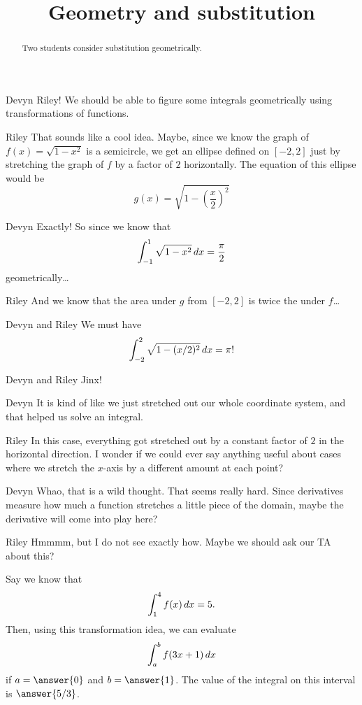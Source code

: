 \documentclass{ximera}
\title[Break-Ground:]{Geometry and substitution}
\begin{document}
\begin{abstract}
Two students consider substitution geometrically.
\end{abstract}
\maketitle

\begin{dialogue}
\item[Devyn] Riley! We should be able to figure some integrals
  geometrically using transformations of functions.
\item[Riley] That sounds like a cool idea.  Maybe, since we know the
  graph of $f(x) = \sqrt{1-x^2}$ is a semicircle, we get an ellipse
  defined on $[-2,2]$ just by stretching the graph of $f$ by a factor
  of $2$ horizontally.  The equation of this ellipse would be
  \[
  g(x) =\sqrt{1-\left(\frac{x}{2}\right)^2}
  \]
\item[Devyn] Exactly!  So since we know that
  \[
  \int_{-1}^1 \sqrt{1-x^2} \,d x = \frac{\pi}{2}
  \]
  geometrically\dots
\item[Riley] And we know that the area under $g$ from $[-2,2]$ is
  twice the under $f$\dots
\item[Devyn and Riley] We must have
  \[
  \int_{-2}^2 \sqrt{1-(x/2)^2} \,d x =\pi !
  \]
\item[Devyn and Riley] Jinx!
\item[Devyn] It is kind of like we just stretched out our whole
  coordinate system, and that helped us solve an integral.
\item[Riley] In this case, everything got stretched out by a constant
  factor of $2$ in the horizontal direction.  I wonder if we could
  ever say anything useful about cases where we stretch the $x$-axis
  by a different amount at each point?
\item[Devyn] Whao, that is a wild thought.  That seems really hard.
  Since derivatives measure how much a function stretches a little
  piece of the domain, maybe the derivative will come into play here?
\item[Riley] Hmmmm, but I do not see exactly how.  Maybe we should ask
  our TA about this?
\end{dialogue}


\begin{problem}
  Say we know that
  \[
  \int_1^4 f(x) \,d x = 5.
  \]
  Then, using this transformation idea, we can evaluate
  \[
  \int_a^b f(3x+1)\,d x
  \]
  if $a= \answer{0}$ and $b=\answer{1}$.  The value of the integral on
  this interval is $\answer{5/3}$.
\end{problem}


\end{document}

